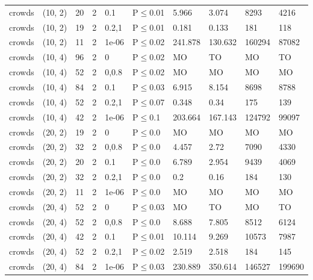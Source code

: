 \begin{longtable}{llrrllllll}
 crowds        & (10, 2)   &     	20 &   2 & 0.1   & P$\leq$0.01  & 5.966    & 3.074    & 8293    & 4216   \\
 crowds        & (10, 2)   &     	19 &   2 & 0.2,1 & P$\leq$0.01  & 0.181    & 0.133    & 181     & 118    \\
 crowds        & (10, 2)   &     	11 &   2 & 1e-06 & P$\leq$0.02  & 241.878  & 130.632  & 160294  & 87082  \\
 crowds        & (10, 4)   &     	96 &   2 & 0     & P$\leq$0.02  & MO       & TO       & MO      & TO     \\
 crowds        & (10, 4)   &     	52 &   2 & 0,0.8 & P$\leq$0.02  & MO       & MO       & MO      & MO     \\
 crowds        & (10, 4)   &     	84 &   2 & 0.1   & P$\leq$0.03  & 6.915    & 8.154    & 8698    & 8788   \\
 crowds        & (10, 4)   &     	52 &   2 & 0.2,1 & P$\leq$0.07  & 0.348    & 0.34     & 175     & 139    \\
 crowds        & (10, 4)   &     	42 &   2 & 1e-06 & P$\leq$0.1   & 203.664  & 167.143  & 124792  & 99097  \\
 crowds        & (20, 2)   &     	19 &   2 & 0     & P$\leq$0.0   & MO       & MO       & MO      & MO     \\
 crowds        & (20, 2)   &     	32 &   2 & 0,0.8 & P$\leq$0.0   & 4.457    & 2.72     & 7090    & 4330   \\
 crowds        & (20, 2)   &     	20 &   2 & 0.1   & P$\leq$0.0   & 6.789    & 2.954    & 9439    & 4069   \\
 crowds        & (20, 2)   &     	32 &   2 & 0.2,1 & P$\leq$0.0   & 0.2      & 0.16     & 184     & 130    \\
 crowds        & (20, 2)   &     	11 &   2 & 1e-06 & P$\leq$0.0   & MO       & MO       & MO      & MO     \\
 crowds        & (20, 4)   &     	52 &   2 & 0     & P$\leq$0.03  & MO       & TO       & MO      & TO     \\
 crowds        & (20, 4)   &     	52 &   2 & 0,0.8 & P$\leq$0.0   & 8.688    & 7.805    & 8512    & 6124   \\
 crowds        & (20, 4)   &     	42 &   2 & 0.1   & P$\leq$0.01  & 10.114   & 9.269    & 10573   & 7987   \\
 crowds        & (20, 4)   &     	52 &   2 & 0.2,1 & P$\leq$0.02  & 2.519    & 2.518    & 184     & 145    \\
 crowds        & (20, 4)   &     	84 &   2 & 1e-06 & P$\leq$0.03  & 230.889  & 350.614  & 146527  & 199690 \\

\end{longtable}
